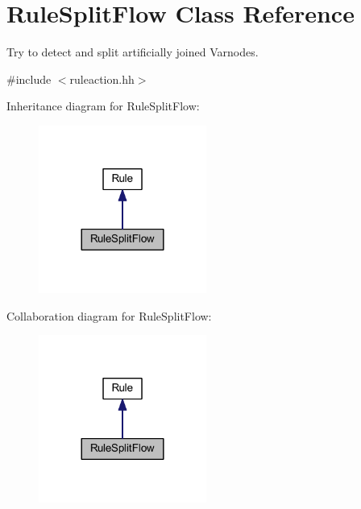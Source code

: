 \hypertarget{class_rule_split_flow}{}\section{Rule\+Split\+Flow Class Reference}
\label{class_rule_split_flow}


Try to detect and split artificially joined Varnodes.  




{\ttfamily \#include $<$ruleaction.\+hh$>$}



Inheritance diagram for Rule\+Split\+Flow\+:
\nopagebreak
\begin{figure}[H]
\begin{center}
\leavevmode
\includegraphics[width=156pt]{class_rule_split_flow__inherit__graph}
\end{center}
\end{figure}


Collaboration diagram for Rule\+Split\+Flow\+:
\nopagebreak
\begin{figure}[H]
\begin{center}
\leavevmode
\includegraphics[width=156pt]{class_rule_split_flow__coll__graph}
\end{center}
\end{figure}
